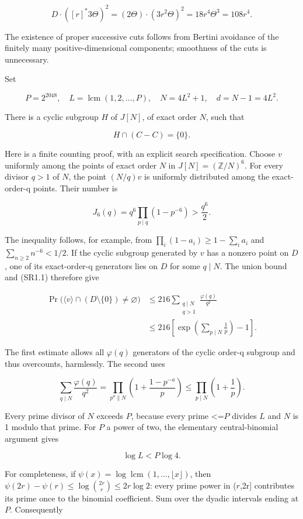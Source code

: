 \[
D\cdot([r]^*3\Theta)^2=(2\Theta)\cdot(3r^2\Theta)^2=18r^4\Theta^3=108r^4.
\]

The existence of proper successive cuts follows from Bertini avoidance of the finitely many positive-dimensional components; smoothness of the cuts is unnecessary.

Set

\[
P=2^{2048},\quad L=\operatorname{lcm}(1,2,\ldots,P),\quad N=4L^2+1,\quad d=N-1=4L^2.\tag{SR1.2}
\]

There is a cyclic subgroup \(H\) of \(J[N]\), of exact order \(N\), such that

\[
H\cap(C-C)=\{0\}.\tag{SR1.3}
\]

Here is a finite counting proof, with an explicit search specification. Choose \(v\) uniformly among the points of exact order \(N\) in \(J[N]=(\mathbb Z/N)^6\). For every divisor \(q> 1\) of \(N\), the point \((N/q)v\) is uniformly distributed among the exact-order-q points. Their number is

\[
J_6(q)=q^6\prod_{p\mid q}(1-p^{-6})>\frac{q^6}{2}.
\]

The inequality follows, for example, from \(\prod_i(1-a_i)\geq1-\sum_i a_i\) and \(\sum_{n\geq2}n^{-6}<1/2\). If the cyclic subgroup generated by \(v\) has a nonzero point on \(D\), one of its exact-order-q generators lies on \(D\) for some \(q\mid N\). The union bound and (SR1.1) therefore give

\[
\begin{aligned}\Pr\bigl(\langle v\rangle\cap(D\setminus\{0\})\ne\varnothing\bigr)&\leq216\sum_{\substack{q\mid N\\q>1}}\frac{\varphi(q)}{q^2}\\&\leq216\left[\exp\left(\sum_{p\mid N}\frac1p\right)-1\right].\end{aligned}\tag{SR1.4}
\]

The first estimate allows all \(\varphi(q)\) generators of the cyclic order-q subgroup and thus overcounts, harmlessly. The second uses

\[
\sum_{q\mid N}\frac{\varphi(q)}{q^2}=\prod_{p^a\parallel N}\left(1+\frac{1-p^{-a}}p\right)\leq\prod_{p\mid N}\left(1+\frac1p\right).
\]

Every prime divisor of \(N\) exceeds \(P\), because every prime \textless{}=\(P\) divides \(L\) and \(N\) is 1 modulo that prime. For \(P\) a power of two, the elementary central-binomial argument gives

\[
\log L<P\log4.
\]

For completeness, if \(\psi(x)=\log\operatorname{lcm}(1,\ldots,\lfloor x\rfloor)\), then \(\psi(2r)-\psi(r)\leq\log\binom{2r}{r}\leq2r\log2\): every prime power in (\(r\),2r] contributes its prime once to the binomial coefficient. Sum over the dyadic intervals ending at \(P\). Consequently

